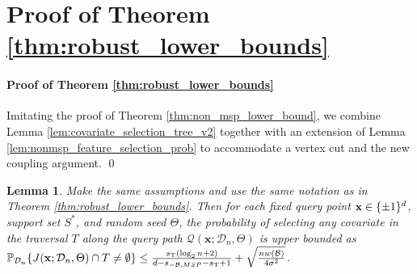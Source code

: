 \documentclass[11pt]{article}
\newtheorem{lemma}[theorem]{Lemma}
\newcommand{\bx}{\mathbf{x}}
\DeclarePairedDelimiter{\braces}{\lbrace}{\rbrace}
\DeclarePairedDelimiter{\paren}{(}{)}
\DeclarePairedDelimiter{\norm}{\|}{\|}
\renewcommand{\P}{\mathbb{P}}
\newcommand{\binspace}{\braces{\pm 1}^\nfeats}
\newcommand{\sparsity}{s}
\newcommand{\nfeats}{d}
\newcommand{\nsamples}{n}
\newcommand{\data}[1][n]{\mathcal{D}_{#1}}
\newcommand{\MSP}{\textsf{MSP}}
\newcommand{\suppset}{S^*}
\newcommand{\cutset}{\mathcal{B}}
\newcommand{\traversal}{T}
\newcommand{\querypath}{\mathcal{Q}}
\newcommand{\traversalsize}{\sparsity_{\operatorname{T}}}
\begin{document}

\section{Proof of Theorem \ref{thm:robust_lower_bounds}}
\label{sec:robust_lower_bounds_proofs}

\paragraph{Proof of Theorem \ref{thm:robust_lower_bounds}}

Imitating the proof of Theorem \ref{thm:non_msp_lower_bound}, we combine Lemma \ref{lem:covariate_selection_tree_v2} together with an extension of Lemma \ref{lem:nonmsp_feature_selection_prob} to accommodate a vertex cut and the new coupling argument. \qed

\begin{lemma}
    \label{lem:nonmsp_robst_feature_selection_prob}
    Make the same assumptions and use the same notation as in Theorem \ref{thm:robust_lower_bounds}.
    Then for each fixed query point $\bx \in \binspace$, support set $\suppset$, and random seed $\Theta$, the probability of selecting any covariate in the traversal $\traversal$ along the query path $\querypath(\bx;\data,\Theta)$ is upper bounded as $\P_{\data}\braces*{J(\bx;\data,\Theta)\cap \traversal \neq \emptyset } \leq \frac{\traversalsize(\log_2 \nsamples + 2)}{\nfeats - \sparsity_{-\cutset,\MSP}-\traversalsize +1} + \sqrt{\frac{\nsamples w(\cutset)}{4\sigma^2}}$.
\end{lemma}
\end{document}
